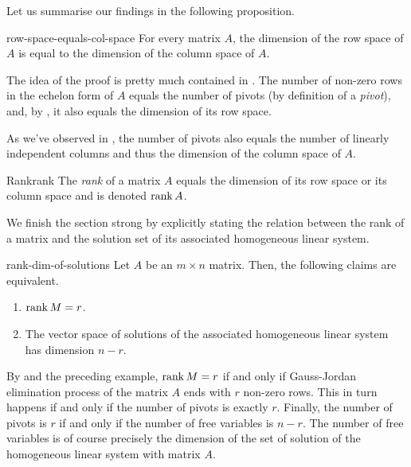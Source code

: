 Let us summarise our findings in the following proposition.

\begin{proposition}{}{row-space-equals-col-space}
 For every matrix $A$, the dimension of the row space of $A$ is equal to the
 dimension of the column space of $A$.
\end{proposition}
\begin{propproof}
 The idea of the proof is pretty much contained in
 . The number of non-zero rows in the
 echelon form of $A$ equals the number of pivots (by definition of a
 \emph{pivot}), and, by , it also equals the
 dimension of its row space.

 As we've observed in , the number of
 pivots also equals the number of linearly independent columns and thus the
 dimension of the column space of $A$.
\end{propproof}

\begin{definition}{Rank}{rank}
 The \emph{rank} of a matrix $A$ equals the dimension of its row space or its
 column space and is denoted $\operatorname{rank} A$.
\end{definition}

We finish the section strong by explicitly stating the relation between the rank
of a matrix and the solution set of its associated homogeneous linear system.

\begin{theorem}{}{rank-dim-of-solutions}
 Let $A$ be an $m \times n$ matrix. Then, the following claims are equivalent.
 \begin{enumerate}
  \item $\operatorname{rank} M = r$.
  \item The vector space of solutions of the associated homogeneous linear
   system has dimension $n - r$.
 \end{enumerate}
\end{theorem}
\begin{thmproof}
 By  and the preceding
 example, $\operatorname{rank} M = r$ if and only if Gauss-Jordan elimination process of the
 matrix $A$ ends with $r$ non-zero rows. This in turn happens if and only if the
 number of pivots is exactly $r$. Finally, the number of pivots is $r$ if and
 only if the number of free variables is $n - r$. The number of free variables
 is of course precisely the dimension of the set of solution of the homogeneous
 linear system with matrix $A$.
\end{thmproof}

